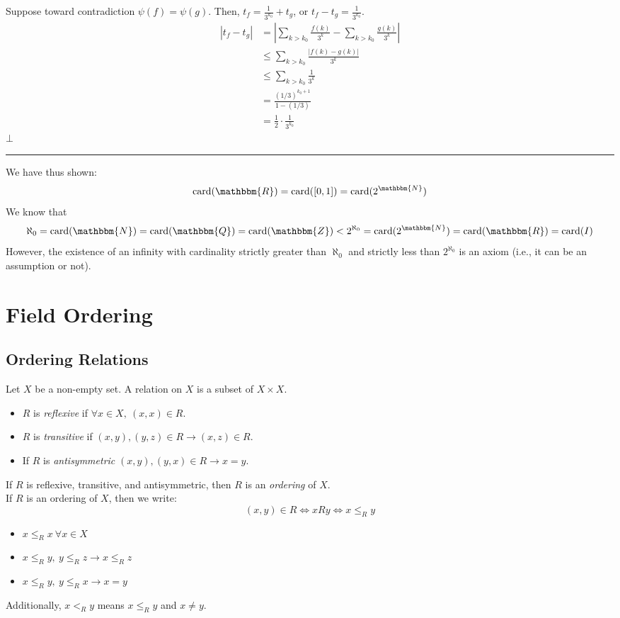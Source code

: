 \documentclass[10pt]{extarticle}
\newcommand{\card}{\text{card}}
\newcommand{\N}{\mathbbm{N}}
\newcommand{\Q}{\mathbbm{Q}}
\newcommand{\Z}{\mathbbm{Z}}
\newcommand{\R}{\mathbbm{R}}
\begin{document}
\begin{description}
          Suppose toward contradiction $\psi(f) = \psi(g)$. Then, $t_f = \frac{1}{3^{k_0}} + t_g$, or $t_f - t_g = \frac{1}{3^{k_0}}$.
          \begin{align*}
            |t_f-t_g| &= |\sum_{k>k_0}\frac{f(k)}{3^k} - \sum_{k>k_0}\frac{g(k)}{3^k}|\\
                      &\leq \sum_{k>k_0}\frac{|f(k)-g(k)|}{3^k}\\
                      &\leq \sum_{k>k_0}\frac{1}{3^{k}}\\
                      &= \frac{(1/3)^{k_0+1}}{1-(1/3)}\\
                      &= \frac{1}{2}\cdot\frac{1}{3^{k_0}}
          \end{align*}
          $\bot$
    \end{description}
    \begin{center}
      \rule{0.5\textwidth}{0.4pt}
    \end{center}
    We have thus shown:
    \[
      \card(\R) = \card([0,1]) = \card(2^{\N})
    \] 
    We know that \[\aleph_0 = \card(\N) = \card(\Q) = \card(\Z) < 2^{\aleph_0} = \card(2^{\N}) = \card(\R) = \card(I)\] However, the existence of an infinity with cardinality strictly greater than $\aleph_0$ and strictly less than $2^{\aleph_0}$ is an axiom (i.e., it can be an assumption or not).\\
  \section{Field Ordering}%
  \subsection{Ordering Relations}%
    Let $X$ be a non-empty set. A relation on $X$ is a subset of $X\times X$.
    \begin{itemize}
      \item $R$ is \textsl{reflexive} if $\forall x\in X,~(x,x)\in R$.
      \item $R$ is \textsl{transitive} if $(x,y),(y,z)\in R \rightarrow (x,z)\in R$.
      \item If $R$ is \textsl{antisymmetric} $(x,y),(y,x)\in R\rightarrow x=y$. 
    \end{itemize}
    If $R$ is reflexive, transitive, and antisymmetric, then $R$ is an \textsl{ordering} of $X$.\\

    If $R$ is an ordering of $X$, then we write:
    \[
      (x,y)\in R \Leftrightarrow xRy \Leftrightarrow x\leq_{R} y
    \] 
    \begin{itemize}
      \item $x\leq_{R}x~\forall x\in X$
      \item $x\leq_R y,~y\leq_R z \rightarrow x\leq_R z$
      \item $x\leq_R y,~y\leq_R x \rightarrow x=y$
    \end{itemize}
    Additionally, $x<_R y$ means $x\leq_R y$ and $x\neq y$.
\end{document}
